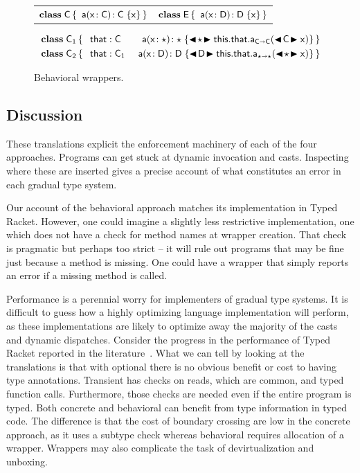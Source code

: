 \documentclass[a4paper,UKenglish]{lipics-v2018}
\newcommand{\HS}{\hspace{.2cm}}
\newcommand{\EM}[1]{\ensuremath{#1}\xspace}
\newcommand{\xt}[1]{{\sf{#1}}}
\newcommand{\bt}[1]{\xt{\bf #1}}
\newcommand{\EMxt}[1]{\EM{\xt{#1}}}
\newcommand{\x}{\EMxt x}
\newcommand{\any}{\EM{\star}}
\newcommand{\this}{\EMxt{this}}
\newcommand{\that}{\EMxt{that}}
\newcommand{\KCall}[5]{\EM{{#1}.{#2}_{{#4} \shortrightarrow {#5}}(#3)}}
\newcommand{\BehStart}{\EM{\blacktriangleleft}}
\newcommand{\BehEnd}{\EM{\blacktriangleright}}
\newcommand{\BehCast}[2]{\EM{\BehStart\! #1\! \BehEnd #2}}
\newcommand{\HT}[2]{\EM{{#1}\!:{#2}}}
\newcommand{\Mdef}[5]{\EM{ \HT{ #1( \HT{#2}{#3})}{#4}\;\{{#5}\}}}
\newcommand{\Class}[3]{\EM{\bt{class}\;#1\,\{\,#2~#3\,\}}}
\newcounter{lem}
\begin{document}
\begin{figure}[h!]\hrulefill\vspace{2mm}

\begin{tabularx}{\textwidth}{XX}
\Class\C{}{\Mdef{\xt{a}}\x\C\C\x} & \Class{\xt E}{}{\Mdef{\xt{a}}\x\D\D\x}
\end{tabularx}

\vspace{-4mm}
\begin{align*}
\Class{\C_1}{\HS&\that : \C}{&\Mdef{\xt{a}}\x\any\any{\BehCast\any{\KCall{\this.\that}{\xt{a}}{\BehCast\C\x}\C\C}}} \\
\Class{\C_2}{\HS &\that : \C_1}{&\Mdef{\xt{a}}\x\D\D{\BehCast\D{\KCall{\this.\that}{\xt{a}}{\BehCast\any\x}\any\any}}}
\end{align*}
\vspace{-8mm}

\hrulefill
\caption{Behavioral wrappers.}\label{fig:behex}
\end{figure}

\subsection{Discussion}

These translations explicit the enforcement machinery of each of the four
approaches. Programs can get stuck at dynamic invocation and
casts. Inspecting where these are inserted gives a precise account of what
constitutes an error in each gradual type system.

Our account of the behavioral approach matches its implementation in Typed
Racket. However, one could imagine a slightly less restrictive implementation,
one which does not have a check for method names at wrapper creation. That
check is pragmatic but perhaps too strict -- it will rule out programs that
may be fine just because a method is missing. One could have a wrapper that
simply reports an error if a missing method is called.

Performance is a perennial worry for implementers of gradual type systems.
It is difficult to guess how a highly optimizing language
implementation will perform, as these implementations are likely to optimize
away the majority of the casts and dynamic dispatches. Consider the progress
in the performance of Typed Racket reported in the
literature~\cite{popl16,OnlyMostly}. What we can tell by looking at the
translations is that with optional there is no obvious benefit or cost to
having type annotations. Transient has checks on reads, which are common,
and typed function calls. Furthermore, those checks are needed even if the
entire program is typed. Both concrete and behavioral can benefit from type
information in typed code. The difference is that the cost of boundary
crossing are low in the concrete approach, as it uses a subtype check whereas
behavioral requires allocation of a wrapper. Wrappers 
may also complicate the task of devirtualization and unboxing.
\end{document}
